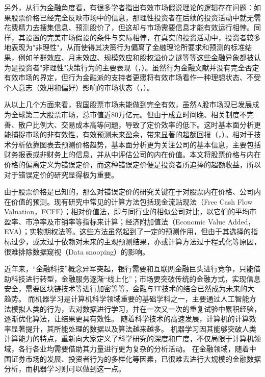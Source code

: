 另外，从行为金融角度看，有很多学者指出有效市场假说理论的逻辑存在问题：如果股票价格已经完全反映市场中的信息，那理性投资者在后续的投资活动中就无需花费精力去搜集信息、预测股价了，但这却与市场需要信息才能有效运行相悖。同样，其设置的完美市场假设的条件与实际相悖，在真实的投资活动中，投资者较多地表现为"非理性"，从而使得其决策行为偏离了金融理论所要求和预测的标准结果，例如羊群效应、月末效应、规模效应和股权溢价之谜等等这些金融异象都被认为是投资者"非理性"决策行为的主要表现（\citeauthor{zhangTouZiZheZhenDeShiLiXingDeMaXingWeiJinRongXueDuiFaMaDeShiChangYouXiaoJiaShuo2015e}，\citeyear{zhangTouZiZheZhenDeShiLiXingDeMaXingWeiJinRongXueDuiFaMaDeShiChangYouXiaoJiaShuo2015e}）。虽然行为金融文献并没有完全否定有效市场的界定，但行为金融派的支持者更愿将有效市场看作一种理想状态、不受个人意志（效用和偏好）影响的市场状态（\citeauthor{dingYouXiaoShiChangDeJianYanXingWeiJinRongDuiEMHLiLunDePiPan2017}，\citeyear{dingYouXiaoShiChangDeJianYanXingWeiJinRongDuiEMHLiLunDePiPan2017}）。

从以上几个方面来看，我国股票市场未能做到完全有效，虽然A股市场现已发展成为全球第二大股票市场，总市值近80万亿元。但由于成立时间晚、相关制度不完善、散户比例大、交易成本高等问题，导致了定价效率的低下。这时基本面分析更能捕捉市场的非有效性，有效预测未来盈余，带来显著的超额回报（\citeauthor{wangJiBenMianFenXiZaiZhongGuoAGuShiChangYouYongMaLaiZiJiDuCaiWuBaoBiaoDeZhengJu2018}，\citeyear{wangJiBenMianFenXiZaiZhongGuoAGuShiChangYouYongMaLaiZiJiDuCaiWuBaoBiaoDeZhengJu2018}）。相对于技术分析依靠图表去预测价格趋势，基本面分析更为关注公司的基本信息，主要包括财务报表或非财务上的信息，并从中评估公司的内在价值。本文将股票价格与内在价格的偏离定义为错误定价，而这种错误定价便是投资者所追捧的超额收益，所以对于错误定价的研究显得极为重要。

由于股票价格是已知的，那么对错误定价的研究关键在于对股票内在价格、公司内在价值的预测。现有研究中常见的计算方法包括现金流贴现法（Free Cash Flow Valuation，FCFF）；相对价值法，即与同行业的相似公司对比，以它们的平均市盈率、市净率及市销率等指标来计算；经济附加值法（Economic Value Added，EVA）；实物期权法等。这些方法虽然起到了一定的预测作用，但由于其选择的指标过少，或太过于依赖对未来的主观预测结果，亦或计算方法过于程式化等原因，很难排除数据窥视（Data snooping）的影响。

近年来，“金融科技”概念异军突起，银行需要和互联网金融巨头进行竞争，只能借助科技进行转型，金融服务逐渐“线上化”；市场要突破传统的金融方式，实现信息安全，需要区块链技术等进行加密等等，金融与IT技术的结合已然成为未来的大趋势。
而机器学习是计算机科学领域重要的基础学科之一，主要通过人工智能方法模拟人类的行为，去对数据进行学习，并在一次又一次的重复试验中累积经验，逐渐优化算法，让结果更具有效性。
随着科学技术的高速发展，计算机的计算效率显著提升，其所能处理的数据以及算法越来越多。
机器学习因其能够突破人类计算能力的特点，重新向大家定义了科学研究的深度和广度，不仅局限于计算机领域，各行各业均需要借助其力量进行更为复杂的分析活动。
在金融领域，随着中国证券市场的发展、投资者行为的多样化等因素，已很难去进行大规模的金融数据分析，而机器学习则可以做到这一点。

